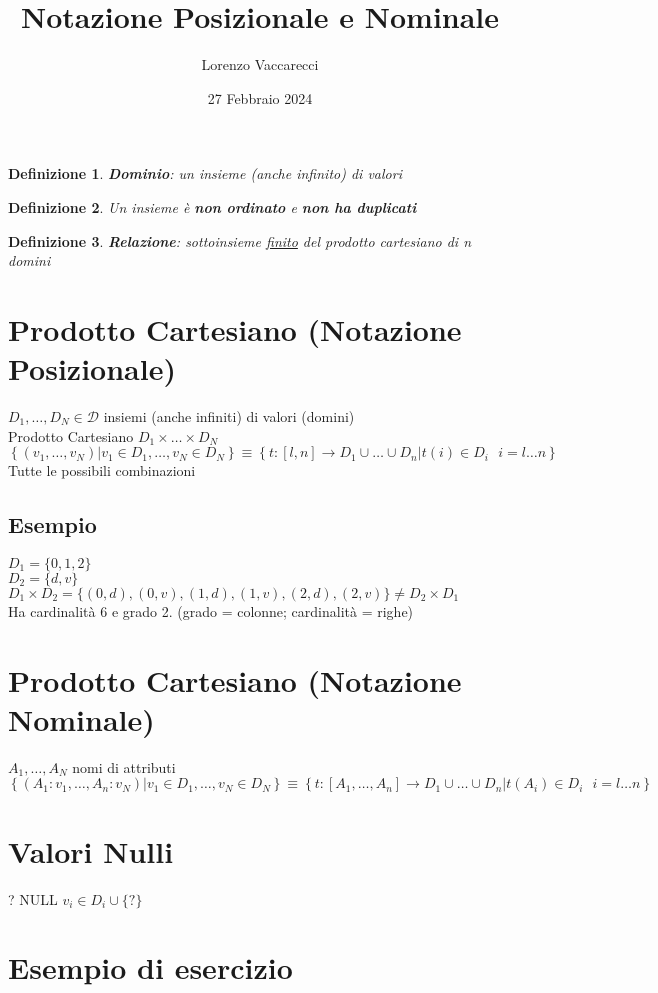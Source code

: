 \documentclass[12pt]{article}
\title{Notazione Posizionale e Nominale}
\author{Lorenzo Vaccarecci}
\date{27 Febbraio 2024}
\newtheorem{definition}{Definizione}
\begin{document}
\maketitle
\begin{definition}
    \textbf{Dominio}: un insieme (anche infinito) di valori
\end{definition}
\begin{definition}
    Un insieme è \textbf{non ordinato} e \textbf{non ha duplicati}
\end{definition}
\begin{definition}
    \textbf{Relazione}: sottoinsieme \underline{finito} del prodotto cartesiano di n domini
\end{definition}
\section{Prodotto Cartesiano (Notazione Posizionale)}
\(D_{1},\dots,D_{N}\in \mathcal{D} \) insiemi (anche infiniti) di valori (domini)\\
Prodotto Cartesiano \(D_{1}\times\dots\times D_{N}\)\\
\(\left\{\left(v_{1},\dots ,v_{N}\right)|v_{1}\in D_{1},\dots,v_{N}\in D_{N}\right\} \equiv \left\{t:[l,n]\rightarrow D_{1}\cup\dots\cup D_{n}|t(i)\in D_{i} \text{ } i=l\dots n\right\}\)
\\Tutte le possibili combinazioni
\subsection*{Esempio}
\(D_{1}=\{0,1,2\}\)\\
\(D_{2}=\{d,v\}\)\\
\(D_{1}\times D_{2} = \{(0,d),(0,v),(1,d),(1,v),(2,d),(2,v)\} \neq D_{2}\times D_{1}\)\\
Ha cardinalità 6 e grado 2.
(grado = colonne; cardinalità = righe)
\section{Prodotto Cartesiano (Notazione Nominale)}
\(A_{1},\dots,A_{N}\) nomi di attributi\\
\(\left\{\left(A_{1}:v_{1},\dots ,A_{n}:v_{N}\right)|v_{1}\in D_{1},\dots,v_{N}\in D_{N}\right\} \equiv \left\{t:[A_{1},\dots,A_{n}]\rightarrow D_{1}\cup\dots\cup D_{n}|t(A_{i})\in D_{i} \text{ } i=l\dots n\right\}\)
\section{Valori Nulli}
? NULL \(v_{i}\in D_{i}\cup\{?\}\)
\section{Esempio di esercizio}
\end{document}
